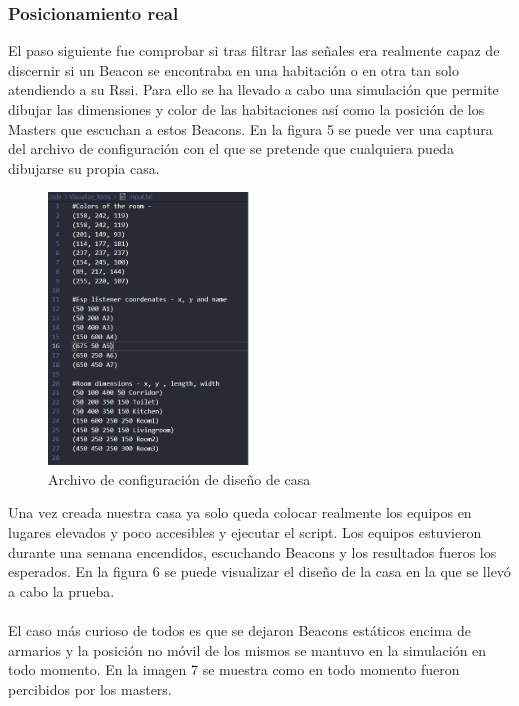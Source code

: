 \documentclass[paper=a4, fontsize=11pt,twoside]{scrartcl}
\begin{document}
        \subsubsection{Posicionamiento real}
            El paso siguiente fue comprobar si tras filtrar las señales era realmente capaz de discernir si un Beacon se encontraba en una habitación
            o en otra tan solo atendiendo a su Rssi. Para ello se ha llevado a cabo una simulación que permite dibujar las dimensiones y color de las 
            habitaciones así como la posición de los Masters que escuchan a estos Beacons. En la figura 5 se puede ver una captura del archivo de configuración 
            con el que se pretende que cualquiera pueda dibujarse su propia casa.
            \begin{center}
                \begin{figure}[]
                    \centering
                    \includegraphics[width=0.5\textwidth]{../../Memmory/images/config_file_house.PNG}
                    \caption{Archivo de configuración de diseño de casa}
                    \label{fig:mesh16}
                \end{figure}
            \end{center}
            Una vez creada nuestra casa ya solo queda colocar realmente los equipos en lugares elevados y poco accesibles y ejecutar el script.
            Los equipos estuvieron durante una semana encendidos, escuchando Beacons y los resultados fueros los esperados. En la figura 6 se puede 
            visualizar el diseño de la casa en la que se llevó a cabo la prueba.
            \paragraph{}
            El caso más curioso de todos es que se dejaron Beacons estáticos encima de armarios y la posición no móvil de los mismos 
            se mantuvo en la simulación en todo momento. En la imagen 7 se muestra como en todo momento fueron percibidos por los masters.
\end{document}
